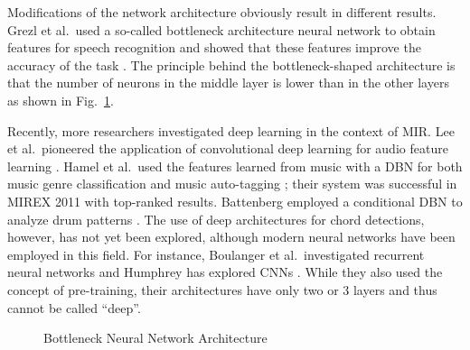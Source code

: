 \documentclass{article}
\begin{document}
Modifications of the network architecture obviously result in different results. Grezl et al.\ used a so-called bottleneck architecture neural network to obtain features for speech recognition and showed that these features improve the accuracy of the task \cite{grezl2007probabilistic}. The principle behind the bottleneck-shaped architecture is that the number of neurons in the middle layer is lower than in the other layers as shown in Fig.~\ref{fig:bottleneck}.

Recently, more researchers investigated deep learning in the context of MIR. Lee et al.\ pioneered the application of convolutional deep learning for audio feature learning \cite{lee2009unsupervised}. Hamel et al.\ used the features learned from music with a DBN for both music genre classification and music auto-tagging \cite{hamel2010learning}; their system was successful in MIREX 2011 with top-ranked results. Battenberg employed a conditional DBN to analyze drum patterns \cite{battenberg2012analyzing}. The use of deep architectures for chord detections, however, has not yet been explored, although modern neural networks have been employed in this field. For instance, Boulanger et al.\ investigated recurrent neural networks \cite{boulanger2013audio} and Humphrey has explored CNNs \cite{humphrey2012rethinking,humphrey2012learning}. While they also used the concept of pre-training, their architectures have only two or 3 layers and thus cannot be called ``deep''.
\begin{figure}
 \centerline{}
 \caption{Bottleneck Neural Network Architecture}
 \label{fig:bottleneck}
\end{figure}
\end{document}
